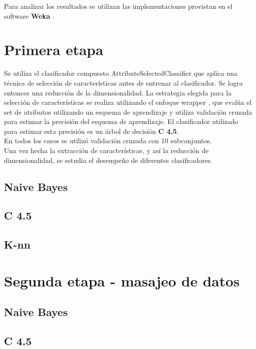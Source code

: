 \documentclass[12pt,a4paper,titlepage]{report}
\begin{document}
Para analizar los resultados se utilizan las implementaciones provistan en el software \textbf{Weka} \cite{bib:weka}.

\section{Primera etapa}
Se utiliza el clasificador compuesto AttributeSelectedClassifier  que aplica una técnica de selección de características antes de entrenar al clasificador. Se logra entonces una reducción de la dimensionalidad. La estrategia elegida para la selección de características se realiza utilizando el enfoque wrapper , que evalúa el set de atributos utilizando un esquema de aprendizaje y utiliza validación cruzada para estimar la precisión del esquema de aprendizaje. El clasificador utilizado para estimar esta precisión es un árbol de decisión \textbf{C 4.5}.\\

En todos los casos se utilizó validación cruzada con 10 subconjuntos.\\

Una vez hecha la extracción de características, y así la reducción de dimensionalidad, se estudia el desempeño de diferentes clasificadores.

\subsection{Naive Bayes}


\subsection{C 4.5}

\subsection{K-nn}



\section{Segunda etapa - masajeo de datos}

\subsection{Naive Bayes}

\subsection{C 4.5}
\end{document}
